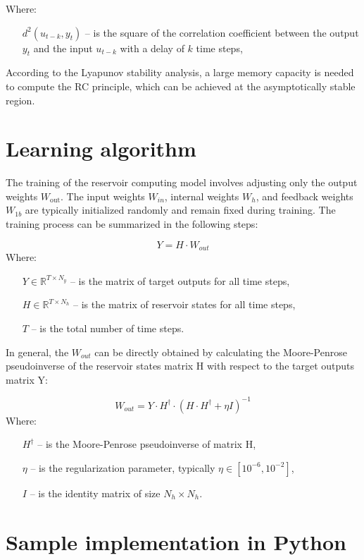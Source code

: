 \documentclass[11pt, oneside]{article}
\begin{document}
Where:
\begin{itemize}[noitemsep, leftmargin=4cm, label={}]
    \item [$d^2(u_{t-k}, y_t)$] -- is the square of the correlation coefficient between the output $y_t$ and the input $u_{t-k }$ with a delay of $k$ time steps,
\end{itemize}

According to the Lyapunov stability analysis, a large memory capacity is needed to compute the RC principle, which can be achieved at the asymptotically stable region.


\section{Learning algorithm}
The training of the reservoir computing model involves adjusting only the output weights $W_{\mathrm{out}}$. The input weights $W_{in}$, internal weights $W_h$, and feedback weights $W_{1b}$ are typically initialized randomly and remain fixed during training. The training process can be summarized in the following steps:

\begin{equation}
    Y = H \cdot W_{out}
\end{equation}
Where:
\begin{itemize}[noitemsep, leftmargin=4cm, label={}]
    \item [$Y \in \mathbb{R}^{T \times N_y}$] -- is the matrix of target outputs for all time steps,
    \item [$H \in \mathbb{R}^{T \times N_h}$] -- is the matrix of reservoir states for all time steps,
    \item [$T$] -- is the total number of time steps.
\end{itemize}

In general, the $W_{out}$ can be directly obtained by calculating the Moore-Penrose pseudoinverse of the reservoir states matrix H with respect to the target outputs matrix Y:

\begin{equation}
    W_{out} = Y \cdot H^{\dagger} \cdot (H \cdot H^{\dagger} + \eta I)^{-1}
\end{equation}
Where: 
\begin{itemize}[noitemsep, leftmargin=2cm, label={}]
    \item [$H^{\dagger}$] -- is the Moore-Penrose pseudoinverse of matrix H,
    \item [$\eta$] -- is the regularization parameter, typically $\eta \in [10^{-6}, 10^{-2}]$,
    \item [$I$] -- is the identity matrix of size $N_h \times N_h$.
\end{itemize}
\clearpage
\section{Sample implementation in Python}



\end{document}
